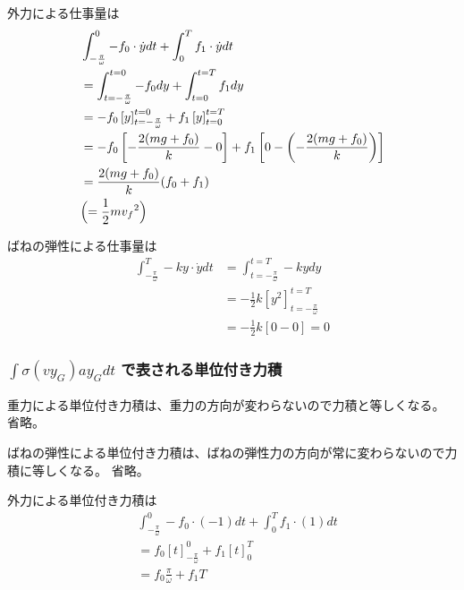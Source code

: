 \documentclass[a4paper,11pt]{jsarticle}
\begin{document}
外力による仕事量は
\begin{align}
   & \int_{-\frac{\pi}{\omega}}^{0} -f_0 \cdot \dot{y} dt
  + \int_{0}^{T} f_1 \cdot \dot{y} dt
  \\
   & = \int_{t=-\frac{\pi}{\omega}}^{t=0} -f_0 dy
  + \int_{t=0}^{t=T} f_1 dy
  \\
   & = -f_0 \left[ y \right]_{t=-\frac{\pi}{\omega}}^{t=0}
  + f_1 \left[ y \right]_{t=0}^{t=T}
  \\
   & = -f_0 \left[ -\frac{2(mg + f_0)}{k} - 0 \right]
  + f_1 \left[ 0 - \left( -\frac{2(mg + f_0)}{k} \right) \right]
  \\
   & =\frac{2(mg + f_0)}{k}(f_0 + f_1)
  \\
   & \Bigl( = \frac{1}{2}m{v_f}^2 \Bigr)
\end{align}

ばねの弾性による仕事量は
\begin{align}
  \int_{-\frac{\pi}{\omega}}^{T} -ky \cdot \dot{y} dt
   & = \int_{t=-\frac{\pi}{\omega}}^{t=T} -ky dy
  \\
   & = -\frac{1}{2}k \left[ y^2 \right]_{t=-\frac{\pi}{\omega}}^{t=T}
  \\
   & = -\frac{1}{2}k \left[ 0 - 0 \right] = 0
\end{align}

\subsubsection{$\int\sigma (vy_G)ay_G dt$ で表される単位付き力積}
重力による単位付き力積は、重力の方向が変わらないので力積と等しくなる。
省略。

ばねの弾性による単位付き力積は、ばねの弾性力の方向が常に変わらないので力積に等しくなる。
省略。

外力による単位付き力積は
\begin{align}
   & \int_{-\frac{\pi}{\omega}}^{0} -f_0 \cdot (-1) dt
  + \int_{0}^{T} f_1 \cdot (1) dt
  \\
   & = f_0 \left[ t \right]_{-\frac{\pi}{\omega}}^{0}
  + f_1 \left[ t \right]_{0}^{T}
  \\
   & = f_0 \frac{\pi}{\omega} + f_1 T
\end{align}
\end{document}
